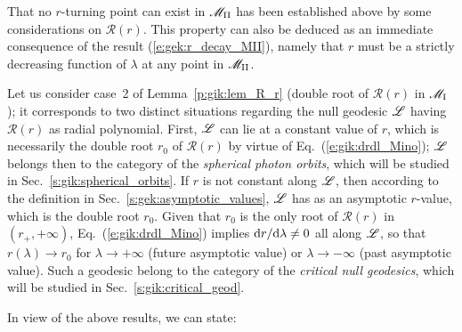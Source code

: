 \begin{remark}
That no $r$-turning point can exist in $\mathscr{M}_{\rm II}$ has been established
above by some considerations on $\mathcal{R}(r)$. This property can also be deduced as
an immediate consequence of the result (\ref{e:gek:r_decay_MII}), namely
that $r$ must be a strictly decreasing function of $\lambda$ at any point
in $\mathscr{M}_{\rm II}$.
\end{remark}

Let us consider case~2 of Lemma~\ref{p:gik:lem_R_r} (double root of $\mathcal{R}(r)$ in $\mathscr{M}_{\rm I}$);
it corresponds to two distinct situations regarding the null geodesic $\mathscr{L}$ having
$\mathcal{R}(r)$ as radial polynomial. First, $\mathscr{L}$ can lie at a constant value
of $r$, which is necessarily the double root $r_0$ of $\mathcal{R}(r)$
by virtue of Eq.~(\ref{e:gik:drdl_Mino}); $\mathscr{L}$ belongs then to the category
of the \emph{spherical photon orbits}, which will be
studied in Sec.~\ref{s:gik:spherical_orbits}. If $r$ is not constant along $\mathscr{L}$,
then according to the definition in Sec.~\ref{s:gek:asymptotic_values},
$\mathscr{L}$ has as an asymptotic $r$-value, which is the double root $r_0$.
Given that $r_0$ is the only root of $\mathcal{R}(r)$ in $(r_+,+\infty)$,
Eq.~(\ref{e:gik:drdl_Mino}) implies
$\mathrm{d} r/\mathrm{d}\lambda\neq 0$ all along $\mathscr{L}$, so that $r(\lambda)\to r_0$ for
$\lambda\to+\infty$ (future asymptotic value)
or $\lambda\to-\infty$ (past asymptotic value). Such a geodesic belong to the
category of the \emph{critical null geodesics}, which will be studied in
Sec.~\ref{s:gik:critical_geod}.


In view of the above results, we can state:

